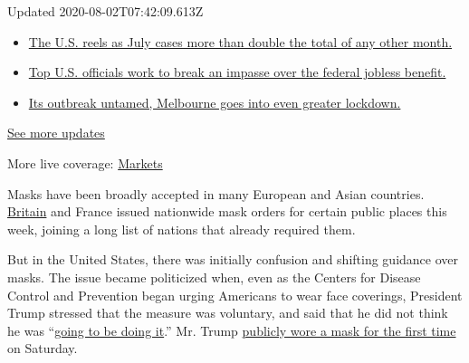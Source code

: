 Updated 2020-08-02T07:42:09.613Z

\begin{itemize}
\tightlist
\item
  \href{https://www.nytimes.com/2020/08/01/world/coronavirus-covid-19.html?action=click\&pgtype=Article\&state=default\&region=MAIN_CONTENT_1\&context=storylines_live_updates\#link-34047410}{The
  U.S. reels as July cases more than double the total of any other
  month.}
\item
  \href{https://www.nytimes.com/2020/08/01/world/coronavirus-covid-19.html?action=click\&pgtype=Article\&state=default\&region=MAIN_CONTENT_1\&context=storylines_live_updates\#link-780ec966}{Top
  U.S. officials work to break an impasse over the federal jobless
  benefit.}
\item
  \href{https://www.nytimes.com/2020/08/01/world/coronavirus-covid-19.html?action=click\&pgtype=Article\&state=default\&region=MAIN_CONTENT_1\&context=storylines_live_updates\#link-2bc8948}{Its
  outbreak untamed, Melbourne goes into even greater lockdown.}
\end{itemize}

\href{https://www.nytimes.com/2020/08/01/world/coronavirus-covid-19.html?action=click\&pgtype=Article\&state=default\&region=MAIN_CONTENT_1\&context=storylines_live_updates}{See
more updates}

More live coverage:
\href{https://www.nytimes.com/live/2020/07/31/business/stock-market-today-coronavirus?action=click\&pgtype=Article\&state=default\&region=MAIN_CONTENT_1\&context=storylines_live_updates}{Markets}

Masks have been broadly accepted in many European and Asian countries.
\href{https://www.nytimes.com/2020/07/14/world/europe/uk-coronavirus-masks-mandate.html}{Britain}
and France issued nationwide mask orders for certain public places this
week, joining a long list of nations that already required them.

But in the United States, there was initially confusion and shifting
guidance over masks. The issue became politicized when, even as the
Centers for Disease Control and Prevention began urging Americans to
wear face coverings, President Trump stressed that the measure was
voluntary, and said that he did not think he was
``\href{https://www.nytimes.com/video/us/politics/100000007070943/trump-mask-coronavirus.html}{going
to be doing it}.'' Mr. Trump
\href{https://www.nytimes.com/2020/07/12/style/president-trump-face-mask.html}{publicly
wore a mask for the first time} on Saturday.

